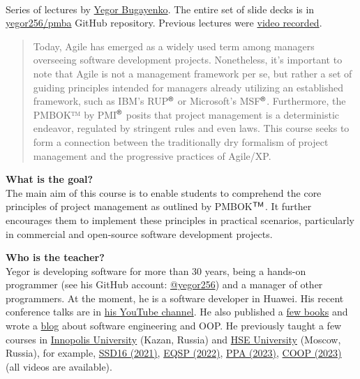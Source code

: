 \documentclass[nobrand,anonymous,nodate,nosecurity]{huawei}
\newcommand\REG{$^{\tiny{\textsf{\textregistered}}}$}
\newcommand\TM{$^{\tiny{\textsf{TM}}}$}
\begin{document}
{\\
Series of lectures by \href{https://www.yegor256.com}{Yegor Bugayenko}.
The entire set of slide decks is in \href{https://github.com/yegor256/pmba}{yegor256/pmba} GitHub repository.
Previous lectures were \href{https://www.youtube.com/playlist?list=PLaIsQH4uc08x_T-Aelduv3Zf0DWRx40pq}{video recorded}.

\begin{abstract}
Today, Agile has emerged as a widely used term among managers overseeing software development projects. Nonetheless, it's important to note that Agile is not a management framework per se, but rather a set of guiding principles intended for managers already utilizing an established framework, such as IBM's RUP\REG{} or Microsoft's MSF\REG{}. Furthermore, the PMBOK™ by PMI\REG{} posits that project management is a deterministic endeavor, regulated by stringent rules and even laws. This course seeks to form a connection between the traditionally dry formalism of project management and the progressive practices of Agile/XP.
\end{abstract}

\textbf{What is the goal?}\\
The main aim of this course is to enable students to comprehend the core principles of project management as outlined by PMBOK\TM{}. It further encourages them to implement these principles in practical scenarios, particularly in commercial and open-source software development projects.

\textbf{Who is the teacher?}\\
Yegor is developing software for more than 30 years,
  being a hands-on programmer (see his GitHub account: \href{https://github.com/yegor256}{@yegor256})
  and a manager of other programmers.
At the moment, he is a software developer in Huawei.
His recent conference talks are in \href{https://www.youtube.com/channel/UCr9qCdqXLm2SU0BIs6d_68Q}{his YouTube channel}.
He also published a \href{https://www.yegor256.com/books.html}{few books}
  and wrote a \href{https://www.yegor256.com/contents.html}{blog} about software engineering
  and OOP.
He previously taught a few courses in
  \href{https://innopolis.university/}{Innopolis University} (Kazan, Russia)
  and
  \href{https://hse.ru}{HSE University} (Moscow, Russia),
  for example,
  \href{https://github.com/yegor256/ssd16}{SSD16 (2021)},
  \href{https://github.com/yegor256/eqsp}{EQSP (2022)},
  \href{https://github.com/yegor256/ppa}{PPA (2023)},
  \href{https://github.com/yegor256/painofoop}{COOP (2023)}
  (all videos are available).

}
\end{document}
